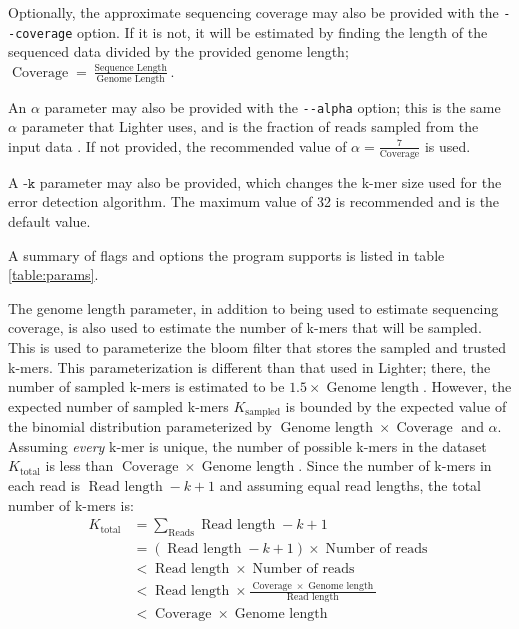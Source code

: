 \documentclass{article}
\begin{document}
\begin{outline}
	\item Optionally, the approximate sequencing coverage may also be provided with the \texttt{-\phantom{}-coverage} option. If it is not, it will be estimated by finding the length of the sequenced data divided by the provided genome length; $\operatorname{Coverage} = \frac{\operatorname{Sequence\:Length}}{\operatorname{Genome\:Length}}$.
	\item An $\alpha$ parameter may also be provided with the \texttt{-\phantom{}-alpha} option; this is the same $\alpha$ parameter that Lighter uses, and is the fraction of reads sampled from the input data \parencite{song_lighter_2014}. If not provided, the recommended value of $\alpha = \frac{7}{\operatorname{Coverage}}$ is used.
	\item A $\texttt{-k}$ parameter may also be provided, which changes the k-mer size used for the error detection algorithm. The maximum value of 32 is recommended and is the default value.
	\item A summary of flags and options the program supports is listed in table \ref{table:params}.
	\item The genome length parameter, in addition to being used to estimate sequencing coverage, is also used to estimate the number of k-mers that will be sampled. This is used to parameterize the bloom filter that stores the sampled and trusted k-mers. This parameterization is different than that used in Lighter; there, the number of sampled k-mers is estimated to be $1.5 \times \operatorname{Genome\:length}$. However, the expected number of sampled k-mers $K_{\operatorname{sampled}}$ is bounded by the expected value of the binomial distribution parameterized by $\operatorname{Genome\:length} \times \operatorname{Coverage}$ and $\alpha$. Assuming \textit{every} k-mer is unique, the number of possible k-mers in the dataset $K_{\operatorname{total}}$ is less than $\operatorname{Coverage} \times \operatorname{Genome\:length}$. Since the number of k-mers in each read is $\operatorname{Read\:length} - k + 1$ and assuming equal read lengths, the total number of k-mers is:
	\begin{align}
	K_{\operatorname{total}} &= \sum_{\operatorname{Reads}}{\operatorname{Read\:length} - k + 1} \\
	&= (\operatorname{Read\:length} - k + 1) \times \operatorname{Number\:of\:reads} \\
	&< \operatorname{Read\:length} \times \operatorname{Number\:of\:reads} \\
	&< \operatorname{Read\:length} \times \frac{\operatorname{Coverage} \times \operatorname{Genome\:length}}{\operatorname{Read\:length}} \\
	&< \operatorname{Coverage} \times \operatorname{Genome\:length}
	\end{align}


\end{outline}
\end{document}
